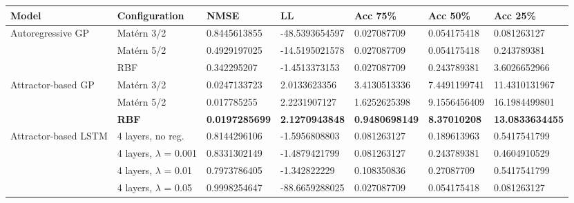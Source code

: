 \documentclass[pdftex,10pt,a4paper,journal]{article}
\theoremstyle{definition}
\theoremstyle{remark}
\begin{document}
{\begin{landscape}
\begin{tabular}{|l|l|l|l|l|l|l|}
\hline
Model                                 & Configuration               & NMSE                  & LL                     & Acc 75\%              & Acc 50\%             & Acc 25\%               \\ \hline
\multirow{3}{*}{Autoregressive GP}    & Mat\'ern 3/2                & 0.8445613855          & -48.5393654597         & 0.027087709           & 0.054175418          & 0.081263127            \\ \cline{2-7} 
                                      & Mat\'ern 5/2                & 0.4929197025          & -14.5195021578         & 0.027087709           & 0.054175418          & 0.243789381            \\ \cline{2-7} 
                                      & RBF                         & 0.342295207           & -1.4513373153          & 0.027087709           & 0.243789381          & 3.6026652966           \\ \hline
\multirow{3}{*}{Attractor-based GP}   & Mat\'ern 3/2                & 0.0247133723          & 2.0133623356           & 3.4130513336          & 7.4491199741         & 11.4310131967          \\ \cline{2-7} 
                                      & Mat\'ern 5/2                & 0.017785255           & 2.2231907127           & 1.6252625398          & 9.1556456409         & 16.1984499801          \\ \cline{2-7} 
                                      & \textbf{RBF}                & \textbf{0.0197285699} & \textbf{2.1270943848}  & \textbf{0.9480698149} & \textbf{8.37010208}  & \textbf{13.0833634455} \\ \hline
\multirow{4}{*}{Attractor-based LSTM} & 4 layers, no reg.           & 0.8144296106          & -1.5956808803          & 0.081263127           & 0.189613963          & 0.5417541799           \\ \cline{2-7} 
                                      & 4 layers, $\lambda$ = 0.001 & 0.8331302149          & -1.4879421799          & 0.081263127           & 0.243789381          & 0.4604910529           \\ \cline{2-7} 
                                      & 4 layers, $\lambda$ = 0.01  & 0.7973786405          & -1.342822229           & 0.108350836           & 0.27087709           & 0.5417541799           \\ \cline{2-7} 
                                      & 4 layers, $\lambda$ = 0.05  & 0.9998254647          & -88.6659288025         & 0.027087709           & 0.054175418          & 0.081263127            \\ \hline

\end{tabular}
\end{landscape}}
\end{document}
